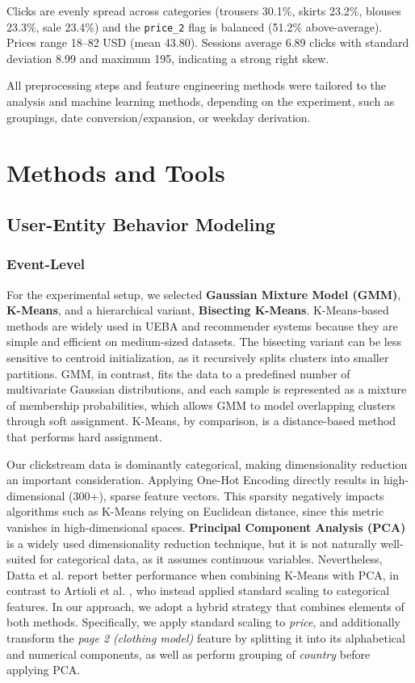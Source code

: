 \documentclass[a4paper,oneside,12pt]{book}
\begin{document}
Clicks are evenly spread across categories (trousers 30.1\%, skirts 23.2\%, blouses 23.3\%, sale 23.4\%) and the \texttt{price\_2} flag is balanced (51.2\% above-average). Prices range 18--82 USD (mean 43.80). Sessions average 6.89 clicks with standard deviation 8.99 and maximum 195, indicating a strong right skew. 

All preprocessing steps and feature engineering methods were tailored to the analysis and machine learning methods, depending on the experiment, such as groupings, date conversion/expansion, or weekday derivation. 

\section{Methods and Tools}

\subsection{User-Entity Behavior Modeling}

\subsubsection{Event-Level}

For the experimental setup, we selected \textbf{Gaussian Mixture Model (GMM)}, \textbf{K-Means}, and a hierarchical variant, \textbf{Bisecting K-Means}. K-Means-based methods are widely used in UEBA and recommender systems because they are simple and efficient on medium-sized datasets. The bisecting variant can be less sensitive to centroid initialization, as it recursively splits clusters into smaller partitions. GMM, in contrast, fits the data to a predefined number of multivariate Gaussian distributions, and each sample is represented as a mixture of membership probabilities, which allows GMM to model overlapping clusters through soft assignment. K-Means, by comparison, is a distance-based method that performs hard assignment. 

Our clickstream data is dominantly categorical, making dimensionality reduction an important consideration. Applying One-Hot Encoding directly results in high-dimensional (300+), sparse feature vectors. This sparsity negatively impacts algorithms such as K-Means relying on Euclidean distance, since this metric vanishes in high-dimensional spaces. \textbf{Principal Component Analysis (PCA)} is a widely used dimensionality reduction technique, but it is not naturally well-suited for categorical data, as it assumes continuous variables. Nevertheless, Datta et al. \cite{datta} report better performance when combining K-Means with PCA, in contrast to Artioli et al. \cite{Artioli2024ACI}, who instead applied standard scaling to categorical features. In our approach, we adopt a hybrid strategy that combines elements of both methods. Specifically, we apply standard scaling to \textit{price}, and additionally transform the \textit{page 2 (clothing model)} feature by splitting it into its alphabetical and numerical components, as well as perform grouping of \textit{country} before applying PCA.
\end{document}
